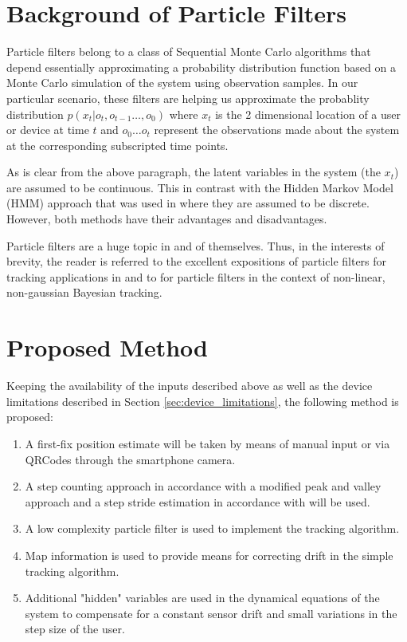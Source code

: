 \section{Background of Particle Filters}
Particle filters belong to a class of Sequential Monte Carlo algorithms 
that depend essentially approximating a probability distribution function based
on a Monte Carlo simulation of the system using observation samples. In our 
particular scenario, these filters are helping us approximate the probablity
distribution $p(x_t|o_t,o_{t-1}\dots,o_0)$ where $x_t$ is the 2 dimensional
location of a user or device at time $t$ and $o_0 \dots o_t$ represent the
observations made about the system at the corresponding subscripted time points.

As is clear from the above paragraph, the latent variables in the system (the
$x_t$) are assumed to be continuous. This in contrast with the Hidden Markov 
Model (HMM) approach that was used in \cite{Ladd} where they are assumed to be 
discrete. However, both methods have their advantages and disadvantages.

Particle filters are a huge topic in and of themselves. Thus, in the interests
of brevity, the reader is referred to the excellent expositions of particle 
filters for tracking applications in \cite{Ristic} and to \cite{Arulampalam}
for particle filters in the context of non-linear, non-gaussian Bayesian
tracking.


\section{Proposed Method}

Keeping the availability of the inputs described above as well as the device 
limitations described in Section \ref{sec:device_limitations}, the following
method is proposed:

\begin{enumerate}
\item A first-fix position estimate will be taken by means of manual input or 
    via QRCodes through the smartphone camera.
\item A step counting approach in accordance with a modified peak and 
    valley approach and a step stride estimation in accordance with
    \cite{ADXL202} will be used.
\item A low complexity particle filter is used to implement the tracking 
    algorithm. 
\item Map information is used to provide means for correcting drift in the 
    simple tracking algorithm.
\item Additional "hidden" variables are used in the dynamical equations of the 
    system to compensate for a constant sensor drift and small variations in 
    the step size of the user. 
\end{enumerate}

